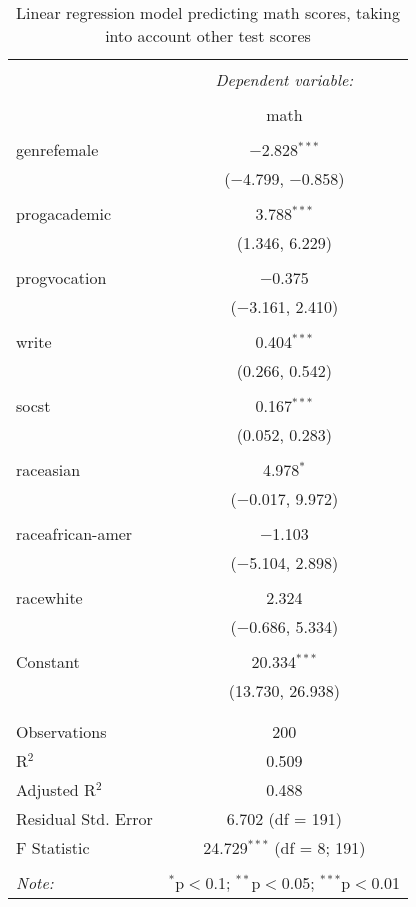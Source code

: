 
\begin{table}[!htbp] \centering 
  \caption{Linear regression model predicting math scores, taking into 
          account other test scores} 
  \label{tab::lm_math_peeking} 
\begin{tabular}{@{\extracolsep{5pt}}lc} 
\\[-1.8ex]\hline 
\hline \\[-1.8ex] 
 & \multicolumn{1}{c}{\textit{Dependent variable:}} \\ 
\cline{2-2} 
\\[-1.8ex] & math \\ 
\hline \\[-1.8ex] 
 genrefemale & $-$2.828$^{***}$ \\ 
  & ($-$4.799, $-$0.858) \\ 
  & \\ 
 progacademic & 3.788$^{***}$ \\ 
  & (1.346, 6.229) \\ 
  & \\ 
 progvocation & $-$0.375 \\ 
  & ($-$3.161, 2.410) \\ 
  & \\ 
 write & 0.404$^{***}$ \\ 
  & (0.266, 0.542) \\ 
  & \\ 
 socst & 0.167$^{***}$ \\ 
  & (0.052, 0.283) \\ 
  & \\ 
 raceasian & 4.978$^{*}$ \\ 
  & ($-$0.017, 9.972) \\ 
  & \\ 
 raceafrican-amer & $-$1.103 \\ 
  & ($-$5.104, 2.898) \\ 
  & \\ 
 racewhite & 2.324 \\ 
  & ($-$0.686, 5.334) \\ 
  & \\ 
 Constant & 20.334$^{***}$ \\ 
  & (13.730, 26.938) \\ 
  & \\ 
\hline \\[-1.8ex] 
Observations & 200 \\ 
R$^{2}$ & 0.509 \\ 
Adjusted R$^{2}$ & 0.488 \\ 
Residual Std. Error & 6.702 (df = 191) \\ 
F Statistic & 24.729$^{***}$ (df = 8; 191) \\ 
\hline 
\hline \\[-1.8ex] 
\textit{Note:}  & \multicolumn{1}{r}{$^{*}$p$<$0.1; $^{**}$p$<$0.05; $^{***}$p$<$0.01} \\ 
\end{tabular} 
\end{table} 
